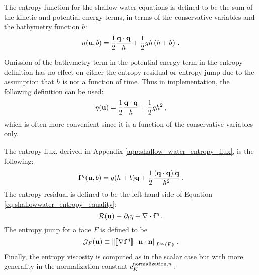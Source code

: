 The entropy function for the shallow water equations is defined to be
the sum of the kinetic and potential energy terms, in terms of the
conservative variables and the bathymetry function $b$:
\begin{equation}
  \eta(\mathbf{u},b)
  = \frac{1}{2}\frac{\mathbf{q}\cdot\mathbf{q}}
  {h} + \frac{1}{2}gh\left(h+b\right)
  \,.
\end{equation}
\begin{remark}
Omission of the bathymetry term in the potential energy
term in the entropy definition has no effect on either the entropy
residual or entropy jump due to the assumption that $b$ is
not a function of time. Thus in implementation, the following definition
can be used:
\begin{equation}
  \eta(\mathbf{u})
  = \frac{1}{2}\frac{\mathbf{q}\cdot\mathbf{q}}
  {h} + \frac{1}{2}gh^2
  \,,
\end{equation}
which is often more convenient since it is a function of the conservative
variables only.
\end{remark}
The entropy flux, derived in Appendix \ref{app:shallow_water_entropy_flux}, is the
following:
\begin{equation}
  \mathbf{f}^\eta(\mathbf{u},b)
  = g(h + b)\mathbf{q}
  + \frac{1}{2}\frac{\left(\mathbf{q}\cdot\mathbf{q}\right)\mathbf{q}} 
  {h^2}
  \,.
\end{equation}
The entropy residual is defined to be the left hand side of 
Equation \eqref{eq:shallowwater_entropy_equality}:
\begin{equation}
  \mathcal{R}(\mathbf{u}) \equiv \partial_t\eta
  + \nabla\cdot\mathbf{f}^\eta
  \,.
\end{equation}
The entropy jump for a face $F$ is defined to be
\begin{equation}
  \mathcal{J}_F(\mathbf{u})
  \equiv \left\|
    \left\llbracket\nabla\mathbf{f}^\eta\right\rrbracket
    \cdot\mathbf{n}\cdot\mathbf{n}
  \right\|_{L^\infty(F)} \,.
\end{equation}
Finally, the entropy viscosity is computed as in the scalar case but with
more generality in the normalization constant $c^{\text{normalization},n}_K$:
